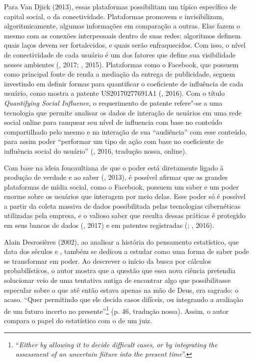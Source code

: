 Para Van Djick (2013), essas plataformas possibilitam um típico
específico de capital social, o da conectividade. Plataformas promovem e
invisibilizam, algoritmicamente, algumas informações em comparação a
outras. Elas fazem o mesmo com as conexões interpessoais dentro de suas
redes: algoritmos definem quais laços devem ser fortalecidos, e quais
serão enfraquecidos. Com isso, o nível de conectividade de cada usuário
é um dos fatores que define sua visibilidade nesses ambientes (,
2017; , 2015). Plataformas como o Facebook, que possuem como
principal fonte de renda a mediação da entrega de publicidade, seguem
investindo em definir formas para quantificar o coeficiente de
influência de cada usuário, como mostra a patente US20170277691A1
(, 2016). Com o título \emph{Quantifying Social Influence}, o
requerimento de patente refere"-se a uma tecnologia que permite analisar
os dados de interação de usuários em uma rede social online para
ranquear seu nível de influencia com base no conteúdo compartilhado pelo
mesmo e na interação de sua ``audiência'' com esse conteúdo, para assim
poder ``performar um tipo de ação com base no coeficiente de influência
social do usuário'' (, 2016, tradução nossa, online).

Com base na ideia foucaultiana de que o poder está diretamente ligado à
produção de verdade e ao saber (, 2013),
é possível afirmar que as grandes plataformas de mídia social, como o
Facebook, possuem um saber e um poder enorme sobre os usuários que
interagem por meio delas. Esse poder só é possível a partir da coleta
massiva de dados possibilitada pelas tecnologias cibernéticas utilizadas
pela empresa, e o valioso saber que resulta dessas práticas é protegido
em seus bancos de dados (, 2017) e em patentes registradas
(; , 2016).

Alain Desrosières (2002), ao analisar a história do pensamento estatístico, que data dos séculos
 e , também se dedicou a estudar como uma forma de saber pode
se transformar em poder. Ao descrever o início da busca por cálculos
probabilísticos, o autor mostra que a questão que essa nova ciência
pretendia solucionar veio de uma tentativa antiga de encontrar algo que
possibilitasse especular sobre o que até então estava apenas na mão de
Deus, era sagrado: o acaso. ``Quer permitindo que ele decida casos
difíceis, ou integrando a avaliação de um futuro incerto no
presente''\footnote{``\emph{Either by allowing it to decide difficult cases,
  or by integrating the assessment of an uncertain fiiture into the
  present time}''.} (p. 46, tradução nossa). Assim, o autor compara o papel
do estatístico com o de um juiz.

